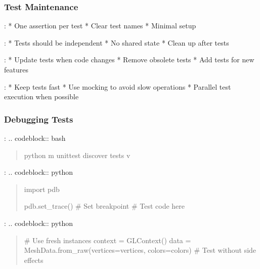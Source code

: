 \documentclass[a4paper,10pt,english,openany,oneside]{sphinxmanual}
\begin{document}
\subsubsection{Test Maintenance}
\label{\detokenize{testing:test-maintenance}}
\sphinxAtStartPar
{}:
* One assertion per test
* Clear test names
* Minimal setup

\sphinxAtStartPar
{}:
* Tests should be independent
* No shared state
* Clean up after tests

\sphinxAtStartPar
{}:
* Update tests when code changes
* Remove obsolete tests
* Add tests for new features

\sphinxAtStartPar
{}:
* Keep tests fast
* Use mocking to avoid slow operations
* Parallel test execution when possible


\subsubsection{Debugging Tests}
\label{\detokenize{testing:debugging-tests}}
\sphinxAtStartPar
{}:
.. code\sphinxhyphen{}block:: bash
\begin{quote}

\sphinxAtStartPar
python \sphinxhyphen{}m unittest discover tests \sphinxhyphen{}v
\end{quote}

\sphinxAtStartPar
{}:
.. code\sphinxhyphen{}block:: python
\begin{quote}

\sphinxAtStartPar
import pdb
\begin{description}
\sphinxAtStartPar
pdb.set\_trace()  \# Set breakpoint
\# Test code here

\end{description}
\end{quote}

\sphinxAtStartPar
{}:
.. code\sphinxhyphen{}block:: python
\begin{quote}
\begin{description}
\sphinxAtStartPar
\# Use fresh instances
context = GLContext()
data = MeshData.from\_raw(vertices=vertices, colors=colors)
\# Test without side effects

\end{description}
\end{quote}
\end{document}
